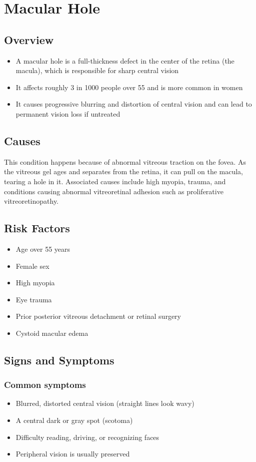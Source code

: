\chapter{Macular Hole}
\label{sec:Macular Hole}

\section{Overview}
\begin{itemize}[noitemsep]
  \item A macular hole is a full-thickness defect in the center of the retina (the macula), which is responsible for sharp central vision
  \item It affects roughly 3 in 1000 people over 55 and is more common in women
  \item It causes progressive blurring and distortion of central vision and can lead to permanent vision loss if untreated
\end{itemize}
\section{Causes}
This condition happens because of abnormal vitreous traction on the fovea. As the vitreous gel ages and separates from the retina, it can pull on the macula, tearing a hole in it. Associated causes include high myopia, trauma, and conditions causing abnormal vitreoretinal adhesion such as proliferative vitreoretinopathy.
\section{Risk Factors}
\begin{itemize}[noitemsep]
  \item Age over 55 years
  \item Female sex
  \item High myopia
  \item Eye trauma
  \item Prior posterior vitreous detachment or retinal surgery
  \item Cystoid macular edema
\end{itemize}
\section{Signs and Symptoms}
\subsection{Common symptoms}
\begin{itemize}[noitemsep]
  \item Blurred, distorted central vision (straight lines look wavy)
  \item A central dark or gray spot (scotoma)
  \item Difficulty reading, driving, or recognizing faces
  \item Peripheral vision is usually preserved
\end{itemize}
